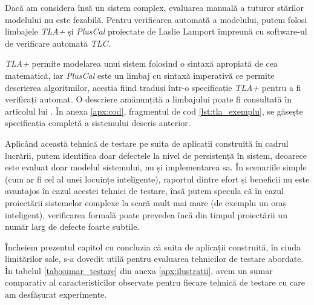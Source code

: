 Dacă am considera însă un sistem complex, evaluarea manuală a tuturor stărilor modelului nu este fezabilă. Pentru verificarea automată a modelului, putem folosi limbajele \textit{TLA+} și \textit{PlusCal} proiectate de Laslie Lamport împreună cu software-ul de verificare automată \textit{TLC}. 

\textit{TLA+} permite modelarea unui sistem folosind o sintaxă apropiată de cea matematică, iar \textit{PlusCal} este un limbaj cu sintaxă imperativă ce permite descrierea algoritmilor, aceștia fiind traduși într-o specificație \textit{TLA+} pentru a fi verificați automat. O descriere amănunțită a limbajului poate fi consultată în articolul lui . În anexa \ref{apx:cod}, fragmentul de cod \ref{lst:tla_exemplu}, se găsește specificația completă a sistemului descris anterior.

Aplicând această tehnică de testare pe suita de aplicații construită în cadrul lucrării, putem identifica doar defectele la nivel de persistență în sistem, deoarece este evaluat doar modelul sistemului, nu și implementarea sa. În scenariile simple (cum ar fi cel al unei locuințe inteligente), raportul dintre efort și beneficii nu este avantajos în cazul acestei tehnici de testare, însă putem specula că în cazul proiectării sistemelor complexe la scară mult mai mare (de exemplu un oraș inteligent), verificarea formală poate prevedea încă din timpul proiectării un număr larg de defecte foarte subtile.

Încheiem prezentul capitol cu concluzia că suita de aplicații construită, în ciuda limitărilor sale, s-a dovedit utilă pentru evaluarea tehnicilor de testare abordate. În tabelul \ref{tab:sumar_testare} din anexa \ref{apx:ilustratii}, avem un sumar comparativ al caracteristicilor observate pentru fiecare tehnică de testare cu care am desfășurat experimente. 